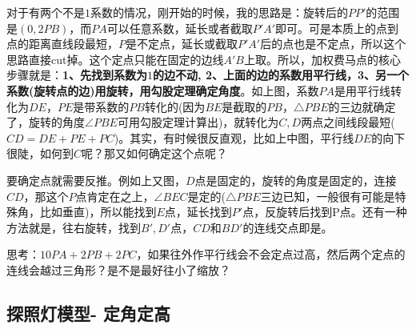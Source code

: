 \documentclass[../main.tex]{subfiles}
\begin{document}
\begin{minipage}{0.3\textwidth}
  \centering
\end{minipage}

对于有两个不是$1$系数的情况，刚开始的时候，我的思路是：旋转后的$PP'$的范围是$(0,2PB)$，而$PA$可以任意系数，延长或者截取$P'A'$即可。可是本质上的点到点的距离直线段最短，$P$是不定点，延长或截取$P'A'$后的点也是不定点，所以这个思路直接cut掉。这个定点只能在固定的边线$A'B$上取。所以，加权费马点的核心步骤就是：\textbf{1、先找到系数为$1$的边不动, 2、上面的边的系数用平行线，3、另一个系数(旋转点的边)用旋转，用勾股定理确定角度}。如上图，系数$PA$是用平行线转化为$DE$，$PE$是带系数的$PB$转化的(因为$BE$是截取的$PB$，$\triangle PBE$的三边就确定了，旋转的角度$\angle PBE$可用勾股定理计算出)，就转化为$C,D$两点之间线段最短($CD=DE+PE+PC$)。其实，有时候很反直观，比如上中图，平行线$DE$的向下很陡，如何到$C$呢？那又如何确定这个点呢？

要确定点就需要反推。例如上又图，$D$点是固定的，旋转的角度是固定的，连接$CD$，那这个$P$点肯定在之上，$\angle BEC$是定的($\triangle PBE$三边已知，一般很有可能是特殊角，比如垂直)，所以能找到$E$点，延长找到$P'$点，反旋转后找到P点。还有一种方法就是，往右旋转，找到$B', D'$点，$CD$和$BD'$的连线交点即是。

思考：$10PA+2PB+2PC$，如果往外作平行线会不会定点过高，然后两个定点的连线会越过三角形？是不是最好往小了缩放？

\subsection{探照灯模型- 定角定高}
\end{document}
